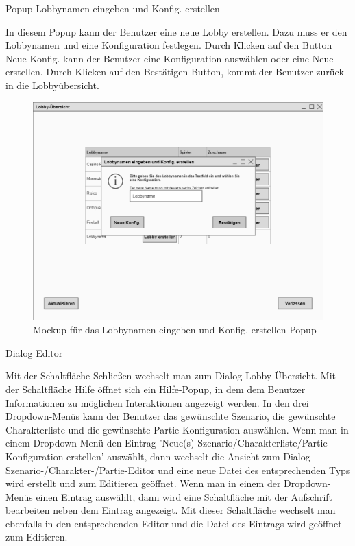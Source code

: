 Popup \glqq{}Lobbynamen eingeben und Konfig. erstellen\grqq{}

In diesem Popup kann der Benutzer eine neue Lobby erstellen. Dazu muss er den Lobbynamen und eine Konfiguration festlegen. Durch Klicken auf den Button Neue Konfig. kann der Benutzer eine Konfiguration auswählen oder eine Neue erstellen. Durch Klicken auf den Bestätigen-Button, kommt der Benutzer zurück in die Lobbyübersicht.

\begin{figure}
  \centering
  \includegraphics[width=\textwidth]{Meilenstein03/LobbynamenEingebenUndKonfigErstellen_Mockup.png}
  \caption{Mockup für das Lobbynamen eingeben und Konfig. erstellen-Popup}
\end{figure}

Dialog \glqq{}Editor\grqq{}

Mit der Schaltfläche \glqq{}Schließen\grqq{} wechselt man zum Dialog \glqq{}Lobby-Übersicht\grqq{}.
Mit der Schaltfläche \glqq{}Hilfe\grqq{} öffnet sich ein Hilfe-Popup, in dem dem Benutzer Informationen zu möglichen Interaktionen angezeigt werden.
In den drei Dropdown-Menüs kann der Benutzer das gewünschte Szenario, die gewünschte Charakterliste und die gewünschte Partie-Konfiguration auswählen. Wenn man in einem Dropdown-Menü den Eintrag 'Neue(s) Szenario/Charakterliste/Partie-Konfiguration erstellen' auswählt, dann wechselt die Ansicht zum Dialog \glqq{}Szenario-/Charakter-/Partie-Editor\grqq{} und eine neue Datei des entsprechenden Typs wird erstellt und zum Editieren geöffnet.
Wenn man in einem der Dropdown-Menüs einen Eintrag auswählt, dann wird eine Schaltfläche mit der Aufschrift \glqq{}bearbeiten\grqq{} neben dem Eintrag angezeigt. Mit dieser Schaltfläche wechselt man ebenfalls in den entsprechenden Editor und die Datei des Eintrags wird geöffnet zum Editieren.


